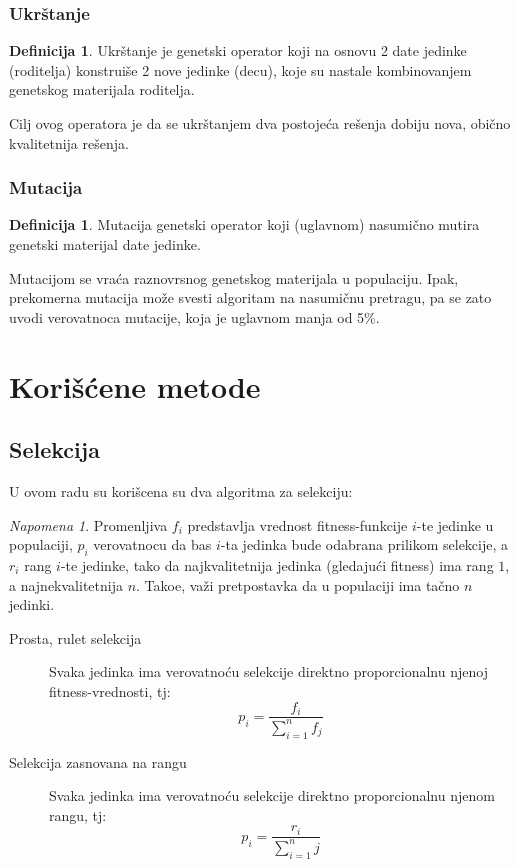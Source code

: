 \documentclass[titlepage]{article}
\theoremstyle{remark}
\newtheorem{rem}[thm]{Napomena}
\theoremstyle{definition}
\newtheorem{df}[thm]{Definicija}
\begin{document}
            \subsubsection{Ukr\v{s}tanje}
            \begin{df}
                Ukr\v{s}tanje je genetski operator koji na osnovu 2 date jedinke (roditelja) konstrui\v{s}e 2 nove jedinke (decu), koje su nastale kombinovanjem genetskog materijala roditelja.
            \end{df}
            Cilj ovog operatora je da se ukr\v{s}tanjem dva postoje\'{c}a re\v{s}enja dobiju nova, obi\v{c}no kvalitetnija re\v{s}enja.
            \subsubsection{Mutacija}
            \begin{df}
                Mutacija genetski operator koji (uglavnom) nasumi\v{c}no mutira genetski materijal date jedinke.
            \end{df}
            Mutacijom se vra\'{c}a raznovrsnog genetskog materijala u populaciju. Ipak, prekomerna mutacija mo\v{z}e svesti algoritam na nasumi\v{c}nu pretragu, pa se zato uvodi verovatnoca mutacije, koja je uglavnom manja od 5\%.
    \section{Kori\v{s}\'{c}ene metode}
        \subsection{Selekcija}
        U ovom radu su kori\v{s}cena su dva algoritma za selekciju:
        \begin{rem}
            Promenljiva $f_i$ predstavlja vrednost fitness-funkcije $i$-te jedinke u populaciji,  $p_i$ verovatnocu da bas $i$-ta jedinka bude odabrana prilikom selekcije, a $r_i$ rang $i$-te jedinke, tako da najkvalitetnija jedinka (gledaju\'{c}i fitness) ima rang $1$, a najnekvalitetnija $n$. Tako\dj{}e, va\v{z}i pretpostavka da u populaciji ima ta\v{c}no $n$ jedinki.
        \end{rem}
        \begin{description}
          \item[Prosta, rulet selekcija]
            Svaka jedinka ima verovatno\'{c}u selekcije direktno proporcionalnu njenoj fitness-vrednosti, tj: $$p_i=\frac{f_i}{\sum_{i=1}^{n}{f_j}}$$
          \item[Selekcija zasnovana na rangu]
            Svaka jedinka ima verovatno\'{c}u selekcije direktno proporcionalnu njenom rangu, tj: $$p_i=\frac{r_i}{\sum_{i=1}^{n}{j}}$$
        \end{description}
\end{document}
